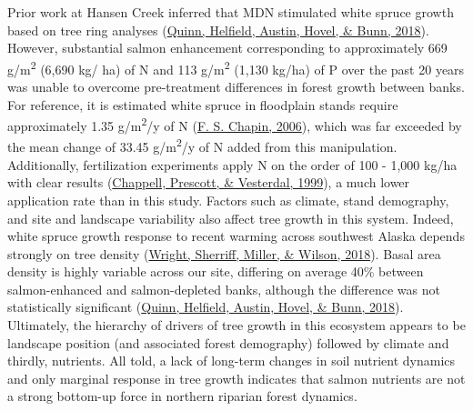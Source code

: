 \documentclass [11pt, proquest] {uwthesis}[2015/03/03]
\begin{document}
Prior work at Hansen Creek inferred that MDN stimulated white spruce growth based on tree ring analyses (\protect\hyperlink{ref-Quinn2018}{Quinn, Helfield, Austin, Hovel, \& Bunn, 2018}). However, substantial salmon enhancement corresponding to approximately 669 g/m\textsuperscript{2} (6,690 kg/ ha) of N and 113 g/m\textsuperscript{2} (1,130 kg/ha) of P over the past 20 years was unable to overcome pre-treatment differences in forest growth between banks. For reference, it is estimated white spruce in floodplain stands require approximately 1.35 g/m\textsuperscript{2}/y of N (\protect\hyperlink{ref-Chapin2006}{F. S. Chapin, 2006}), which was far exceeded by the mean change of 33.45 g/m\textsuperscript{2}/y of N added from this manipulation. Additionally, fertilization experiments apply N on the order of 100 - 1,000 kg/ha with clear results (\protect\hyperlink{ref-Chapell1999}{Chappell, Prescott, \& Vesterdal, 1999}), a much lower application rate than in this study. Factors such as climate, stand demography, and site and landscape variability also affect tree growth in this system. Indeed, white spruce growth response to recent warming across southwest Alaska depends strongly on tree density (\protect\hyperlink{ref-Wright2018}{Wright, Sherriff, Miller, \& Wilson, 2018}). Basal area density is highly variable across our site, differing on average 40\% between salmon-enhanced and salmon-depleted banks, although the difference was not statistically significant (\protect\hyperlink{ref-Quinn2018}{Quinn, Helfield, Austin, Hovel, \& Bunn, 2018}). Ultimately, the hierarchy of drivers of tree growth in this ecosystem appears to be landscape position (and associated forest demography) followed by climate and thirdly, nutrients. All told, a lack of long-term changes in soil nutrient dynamics and only marginal response in tree growth indicates that salmon nutrients are not a strong bottom-up force in northern riparian forest dynamics.
\end{document}
